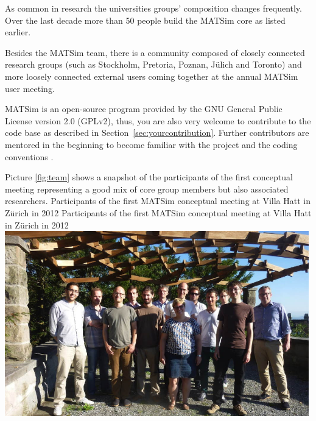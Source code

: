 As common in research the universities groups' composition changes frequently. Over the last decade more than 50 people build the MATSim core as listed earlier.

Besides the MATSim team, there is a community composed of closely connected research groups (such as Stockholm, Pretoria, Poznan, Jülich and Toronto) and more loosely connected external users coming together at the annual MATSim user meeting.   

MATSim is an open-source program provided by the GNU General Public License version 2.0 (GPLv2), thus, you are also very welcome to contribute to the code base as described in Section~\ref{sec:yourcontribution}. Further contributors are mentored in the beginning \citep[][]{MATSIM-T-BecomingAContributor_Webpage_2014} to become familiar with the project and the coding conventions \citep[][]{MATSIM-T-CodingGuide_Webpage_2014}.

Picture \ref{fig:team} shows a snapshot of the participants of the first conceptual meeting representing a good mix of core group members but also associated researchers.
%
\createfigure%
{Participants of the first MATSim conceptual meeting at Villa Hatt in Zürich in 2012}%
{Participants of the first MATSim conceptual meeting at Villa Hatt in Zürich in 2012}%
{\label{fig:team}}%
{\includegraphics[width=0.99\textwidth, angle=0]{extending/figures/ConceptualMeetingVillaHatt.png}}%
{}

